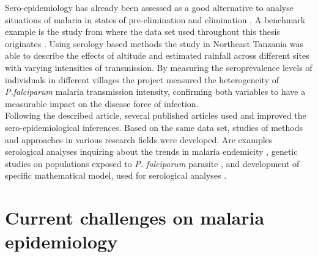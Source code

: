 Sero-epidemiology has already been assessed as a good alternative to analyse situations of malaria in states of pre-elimination and elimination \cite{corran2007serology}.
A benchmark example is the study from where the data set used throughout this thesis originates \cite{drakeley2005altitude}.
Using serology based methods the study in Northeast Tanzania was able to describe the effects of altitude and estimated rainfall across different sites with varying intensities of transmission.
By measuring the seroprevalence levels of individuals in different villages the project measured the heterogeneity of \textit{P.falciparum} malaria transmission intensity, confirming both variables to have a measurable impact on the disease force of infection.
\\
Following the described article, several published articles used and improved the sero-epidemiological inferences.
Based on the same data set, studies of methods and approaches in various research fields were developed.
Are examples serological analyses inquiring about the trends in malaria endemicity \cite{drakeley2005estimating}, genetic studies on populations exposed to \textit{P. falciparum} parasite \cite{enevold2007associations, sepulveda2017malaria}, and development of specific mathematical model, used for serological analyses \cite{bosomprah2014mathematical}.



\section{Current challenges on malaria epidemiology}
\label{seq:challenges}

